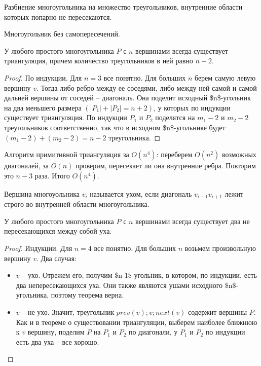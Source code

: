 \documentclass[11pt]{article}
\begin{document}
\begin{defn}[триангуляция]
Разбиение многоугольника на множество
треугольников, внутренние области которых попарно не
пересекаются.
\end{defn}

\begin{defn}
Многоугольник без самопересечений.
\end{defn}

\begin{thm}
У любого простого многоугольника \(P\) с \(n\) вершинами всегда
существует триангуляция, причем количество треугольников в ней
равно \(n-2\).
\end{thm}

\begin{proof}
По индукции. Для \(n=3\) все понятно. Для больших \(n\) берем самую
левую вершину \(v\). Тогда либо ребро между ее соседями, либо между
ней самой и самой дальней вершины от соседей \--- диагональ. Она
поделит исходный \$n\$-угольник на два меньшего размера
\((|P_1| + |P_2| = n + 2)\), у которых по индукции существует
триангуляция. По индукции \(P_1\) и \(P_2\) поделятся на \(m_1 - 2\) и
\(m_2 - 2\) треугольников соответственно, так что в исходном
\$n\$-угольнике будет \((m_1 - 2) + (m_2 - 2) = n - 2\) треугольника.
\end{proof}

Алгоритм примитивной триангуляция за \(O(n^4)\): переберем \(O(n^2)\)
возможных диагоналей, за \(O(n)\) проверим, пересекает ли она
внутренние ребра. Повторим это \(n-3\) раза. Итого \(O(n^4)\).

\begin{defn}[ухо]
Вершина многоуольника \(v_i\) называется ухом, если диагональ
\(v_{i-1}v_{i+1}\) лежит строго во внутренней области многоугольника.
\end{defn}

\begin{thm}
У любого простого многоугольника \(P\) с \(n\) вершинами всегда
существует два не пересекающихся между собой уха.
\end{thm}

\begin{proof}
Индукции. Для \(n=4\) все понятно. Для больших \(n\)
возьмем произвольную вершину \(v\). Два случая:
\begin{itemize}
\item \(v\) \--- ухо. Отрежем его, получим \$n-1\$-угольник, в котором, по
индукции, есть два непересекающихся уха. Они также являются ушами
исходного \$n\$-угольника, поэтому теорема верна.
\item \(v\) \--- не ухо. Значит, треугольник \(prev(v); v; next(v)\) содержит
вершины \(P\). Как и в теореме о существовании триангуляции,
выберем наиболее ближнюю к \(v\) вершину, поделим \(P\) на \(P_1\) и
\(P_2\) по диагонали, у \(P_1\) и \(P_2\) по индукции есть два уха \--- все
хорошо.
\end{itemize}
\end{proof}
\end{document}
